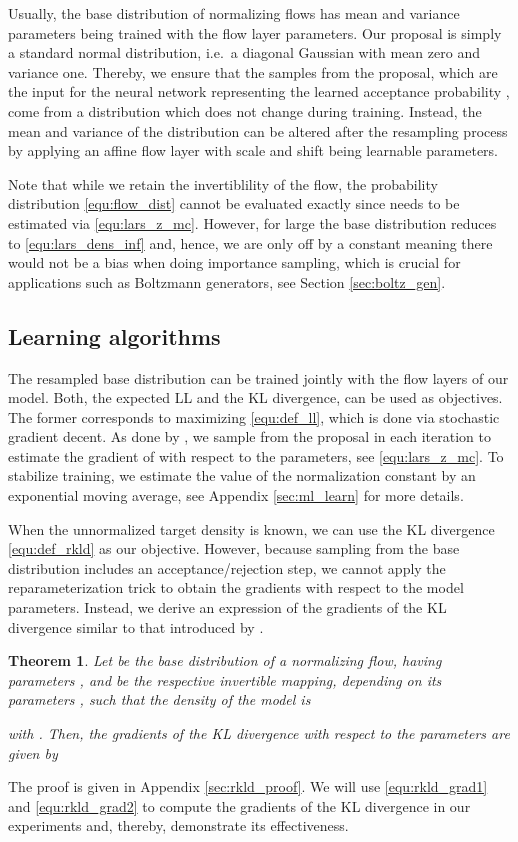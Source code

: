 \documentclass[twoside]{article}
\newtheorem{theorem}{Theorem}
\begin{document}
Usually, the base distribution of normalizing flows has mean and variance parameters being trained with the flow layer parameters. Our proposal is simply a standard normal distribution, i.e.\ a diagonal Gaussian with mean zero and variance one. Thereby, we ensure that the samples from the proposal, which are the input for the neural network representing the learned acceptance probability , come from a distribution which does not change during training. Instead, the mean and variance of the distribution can be altered after the resampling process by applying an affine flow layer with scale and shift being learnable parameters.

Note that while we retain the invertiblility of the flow, the probability distribution \eqref{equ:flow_dist} cannot be evaluated exactly since  needs to be estimated via \eqref{equ:lars_z_mc}. However, for large  the base distribution reduces to \eqref{equ:lars_dens_inf} and, hence, we are only off by a constant meaning there would not be a bias when doing importance sampling, which is crucial for applications such as Boltzmann generators, see Section \ref{sec:boltz_gen}.



\subsection{Learning algorithms}
\label{sec:learning_algs}

The resampled base distribution can be trained jointly with the flow layers of our model. Both, the expected LL and the KL divergence, can be used as objectives. The former corresponds to maximizing \eqref{equ:def_ll}, which is done via stochastic gradient decent. As done by \cite{Bauer2019}, we sample from the proposal in each iteration to estimate the gradient of  with respect to the parameters, see \eqref{equ:lars_z_mc}. To stabilize training, we estimate the value of the normalization constant by an exponential moving average, see Appendix \ref{sec:ml_learn} for more details.

When the unnormalized target density  is known, we can use the KL divergence \eqref{equ:def_rkld} as our objective. However, because sampling from the base distribution includes an acceptance/rejection step, we cannot apply the reparameterization trick \citep{Kingma2014} to obtain the gradients with respect to the model parameters. Instead, we derive an expression of the gradients of the KL divergence similar to that introduced by \cite{Grover2018b}.
\begin{theorem}
	\label{thm:rkld_grad}
	Let  be the base distribution of a normalizing flow, having parameters , and  be the respective invertible mapping, depending on its parameters , such that the density of the model is
	
	with . Then, the gradients of the KL divergence with respect to the parameters are given by
	
\end{theorem}
The proof is given in Appendix \ref{sec:rkld_proof}. We will use \eqref{equ:rkld_grad1} and \eqref{equ:rkld_grad2} to compute the gradients of the KL divergence in our experiments and, thereby, demonstrate its effectiveness.
\end{document}
